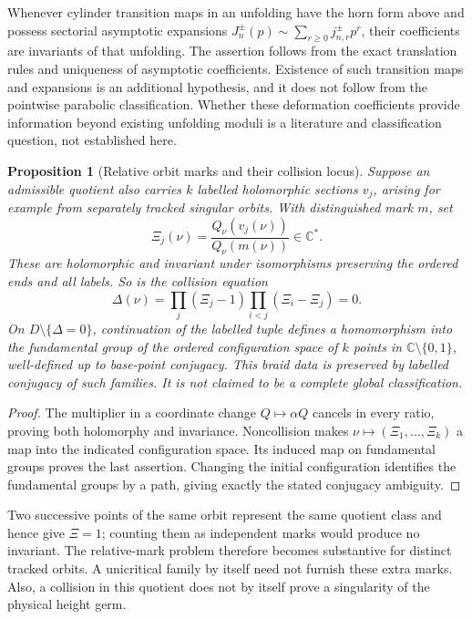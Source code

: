 \documentclass[11pt]{article}
\newtheorem{proposition}[theorem]{Proposition}
\newcommand{\C}{\mathbb C}
\begin{document}
Whenever cylinder transition maps in an unfolding have the horn form
above and possess sectorial asymptotic expansions
$J_n^\pm(p)\sim\sum_{r\ge0}j_{n,r}^\pm p^r$, their coefficients are
invariants of that unfolding. The assertion follows from the exact
translation rules and uniqueness of asymptotic coefficients.
Existence of such transition maps and expansions is an additional
hypothesis, and it does not follow from the pointwise parabolic
classification. Whether these deformation coefficients provide
information beyond existing unfolding moduli is a literature and
classification question, not established here.

\begin{proposition}[Relative orbit marks and their collision locus]
\label{prop:relative-marks}
Suppose an admissible quotient also carries $k$ labelled holomorphic
sections $v_j$, arising for example from separately tracked singular
orbits. With distinguished mark $m$, set
\[
 \Xi_j(\nu)=\frac{Q_\nu(v_j(\nu))}{Q_\nu(m(\nu))}\in\C^*.
\]
These are holomorphic and invariant under isomorphisms preserving the
ordered ends and all labels. So is the collision equation
\[
 \Delta(\nu)=\prod_j(\Xi_j-1)\prod_{i<j}(\Xi_i-\Xi_j)=0.
\]
On $D\setminus\{\Delta=0\}$, continuation of the labelled tuple defines
a homomorphism into the fundamental group of the ordered configuration
space of $k$ points in $\C\setminus\{0,1\}$, well-defined up to base-point
conjugacy. This braid data is preserved by labelled conjugacy of such
families. It is not claimed to be a complete global classification.
\end{proposition}
\begin{proof}
The multiplier in a coordinate change $Q\mapsto\alpha Q$ cancels in
every ratio, proving both holomorphy and invariance. Noncollision makes
$\nu\mapsto(\Xi_1,\ldots,\Xi_k)$ a map into the indicated configuration
space. Its induced map on fundamental groups proves the last assertion.
Changing the initial configuration identifies the fundamental groups
by a path, giving exactly the stated conjugacy ambiguity.
\end{proof}
Two successive points of the same orbit represent the same quotient
class and hence give $\Xi=1$; counting them as independent marks would
produce no invariant. The relative-mark problem therefore becomes
substantive for distinct tracked orbits. A unicritical family by itself
need not furnish these extra marks. Also, a collision in this quotient
does not by itself prove a singularity of the physical height germ.
\end{document}
